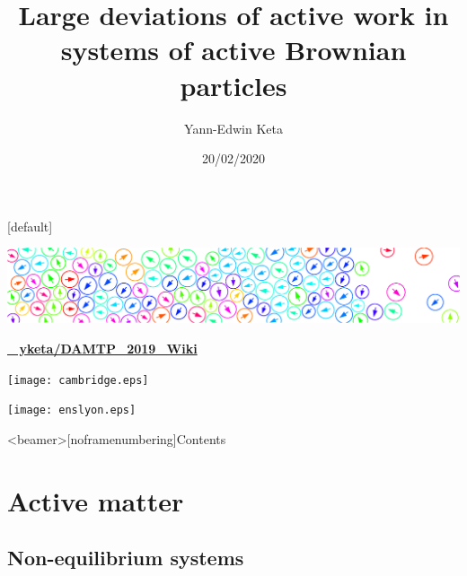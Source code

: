 \documentclass{beamer}
\title{Large deviations of active work in systems of active Brownian particles}
\author{Yann-Edwin Keta}
\date{20/02/2020}
\begin{document}

{
\makeatletter
    [default]
    \def\beamer@entrycode{\vspace*{-\headheight}}
\begin{frame}[noframenumbering]

\vspace*{-4mm}
{
 \hspace*{-\beamerleftmargin}%
\begin{minipage}{\paperwidth}
\includegraphics[width=\paperwidth]{header.eps}
\end{minipage}
}

\titlepage

\vspace{-20pt}
\begin{center}
\href{https://github.com/yketa/DAMTP_2019_Wiki}{\bf{\footnotesize \faGithub~ yketa/DAMTP\_2019\_Wiki}}
\end{center}

\hfill
\begin{minipage}{0.5\linewidth}
\centering
\texttt{[image: cambridge.eps]}
\end{minipage}
\hfill
\begin{minipage}{0.42\linewidth}
\centering
\texttt{[image: enslyon.eps]}
\end{minipage}
\hfill

\end{frame}
}


{\footerwithoutframenumber
\begin{frame}<beamer>[noframenumbering]{Contents}
  \tableofcontents
\end{frame}
}


\section{Active matter}

\subsection{Non-equilibrium systems}
\end{document}
